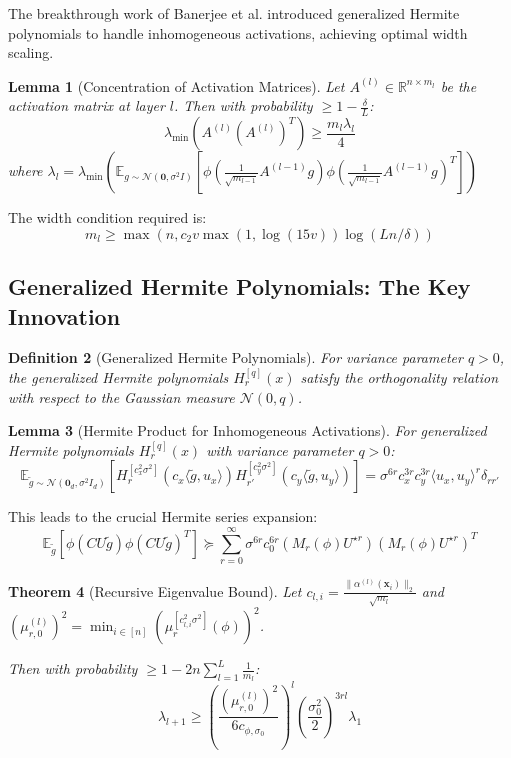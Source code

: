 \documentclass{article}
\newtheorem{theorem}{Theorem}[section]
\newtheorem{lemma}[theorem]{Lemma}
\newtheorem{definition}[theorem]{Definition}
\newcommand{\E}{\mathbb{E}}
\newcommand{\R}{\mathbb{R}}
\newcommand{\evmin}[1]{\lambda_{\min}\left(#1\right)}
\newcommand{\x}{\mathbf{x}}
\newcommand{\cN}{\mathcal{N}}
\begin{document}
The breakthrough work of Banerjee et al. introduced generalized Hermite polynomials to handle inhomogeneous activations, achieving optimal width scaling.

\begin{lemma}[Concentration of Activation Matrices]
Let $A^{(l)} \in \R^{n \times m_l}$ be the activation matrix at layer $l$. Then with probability $\geq 1 - \frac{\delta}{L}$:
$$\evmin{A^{(l)}(A^{(l)})^T} \geq \frac{m_l \lambda_l}{4}$$
where $\lambda_l = \evmin{\E_{g \sim \cN(\bm{0}, \sigma^2 I)} \left[ \phi\left(\frac{1}{\sqrt{m_{l-1}}} A^{(l-1)} g\right) \phi\left(\frac{1}{\sqrt{m_{l-1}}} A^{(l-1)} g\right)^T \right]}$
\end{lemma}

The width condition required is:
$$m_l \geq \max\left(n, c_2 v \max(1, \log(15v)) \log(Ln/\delta)\right)$$

\subsection{Generalized Hermite Polynomials: The Key Innovation}

\begin{definition}[Generalized Hermite Polynomials]
For variance parameter $q > 0$, the generalized Hermite polynomials $H_r^{[q]}(x)$ satisfy the orthogonality relation with respect to the Gaussian measure $\cN(0, q)$.
\end{definition}

\begin{lemma}[Hermite Product for Inhomogeneous Activations]
For generalized Hermite polynomials $H_r^{[q]}(x)$ with variance parameter $q > 0$:
$$\E_{\tilde{g} \sim \cN(\bm{0}_d, \sigma^2 I_d)} [H_r^{[c_x^2 \sigma^2]}(c_x \langle \tilde{g}, u_x \rangle) H_{r'}^{[c_y^2 \sigma^2]}(c_y \langle \tilde{g}, u_y \rangle)] = \sigma^{6r} c_x^{3r} c_y^{3r} \langle u_x, u_y \rangle^r \delta_{rr'}$$
\end{lemma}

This leads to the crucial Hermite series expansion:
$$\E_{\tilde{g}} [\phi(CU\tilde{g}) \phi(CU\tilde{g})^T] \succeq \sum_{r=0}^{\infty} \sigma^{6r} c_0^{6r} (M_r(\phi) U^{\star r})(M_r(\phi) U^{\star r})^T$$

\begin{theorem}[Recursive Eigenvalue Bound]
Let $c_{l,i} = \frac{\|\alpha^{(l)}(\x_i)\|_2}{\sqrt{m_l}}$ and $(\mu_{r,0}^{(l)})^2 = \min_{i \in [n]} (\mu_r^{[c_{l,i}^2 \sigma^2]}(\phi))^2$.

Then with probability $\geq 1 - 2n\sum_{l=1}^L \frac{1}{m_l}$:
$$\lambda_{l+1} \geq \left(\frac{(\mu_{r,0}^{(l)})^2}{6 c_{\phi,\sigma_0}}\right)^l \left(\frac{\sigma_0^2}{2}\right)^{3rl} \lambda_1$$
\end{theorem}
\end{document}

